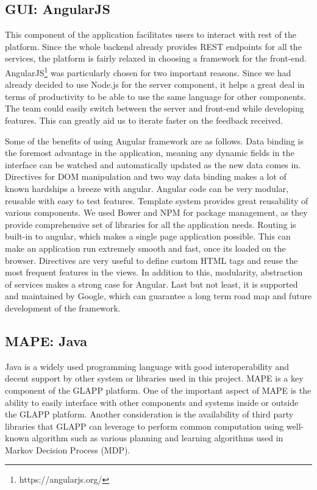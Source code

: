 \documentclass{seal_thesis}
\begin{document}
\subsection{GUI: AngularJS}


This component of the application facilitates users to interact with rest of the platform. 
Since the whole backend already provides REST endpoints for all the services, the platform is fairly relaxed in choosing a framework for the front-end. 
AngularJS\footnote{https://angularjs.org/} was particularly chosen for two important reasons. 
Since we had already decided to use Node.js for the server component, it helps a great deal in terms of productivity to be able to use the same language for other components. 
The team could easily switch between the server and front-end while developing features. 
This can greatly aid us to iterate faster on the feedback received. 

Some of the benefits of using Angular framework are as follows. 
Data binding is the foremost advantage in the application, meaning any dynamic fields in the interface can be watched and automatically updated as the new data comes in. 
Directives for DOM manipulation and two way data binding makes a lot of known hardships a breeze with angular. 
Angular code can be very modular, reusable with easy to test features. 
Template system provides great reusability of various components. 
We used Bower and NPM for package management, as they provide comprehensive set of libraries for all the application needs. 
Routing is built-in to angular, which makes a single page application possible. 
This can make an application run extremely smooth and fast, once its loaded on the browser. 
Directives are very useful to define custom HTML tags and reuse the most frequent features in the views. 
In addition to this, modularity, abstraction of services makes a strong case for Angular. 
Last but not least, it is supported and maintained by Google, which can guarantee a long term road map and future development of the framework.

\subsection{MAPE: Java}
Java is a widely used programming language with good interoperability and decent support by other system or libraries used in this project.
MAPE is a key component of the GLAPP platform.
One of the important aspect of MAPE is the ability to easily interface with other components and systems inside or outside the GLAPP platform.
Another consideration is the availability of third party libraries that GLAPP can leverage to perform common computation using well-known algorithm such as various planning and learning algorithms used in Markov Decision Process (MDP).
\end{document}
